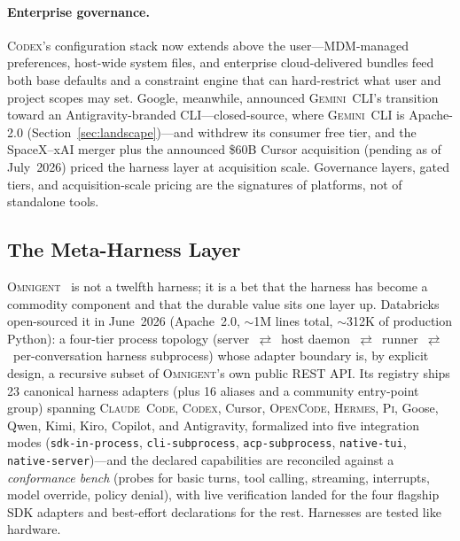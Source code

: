\documentclass[11pt,a4paper]{article}
\newcommand{\clcode}{\textsc{Claude~Code}\xspace}
\newcommand{\cdx}{\textsc{Codex}\xspace}
\newcommand{\gemini}{\textsc{Gemini~CLI}\xspace}
\newcommand{\hrm}{\textsc{Hermes}\xspace}
\newcommand{\pib}{\textsc{Pi}\xspace}
\newcommand{\ocd}{\textsc{OpenCode}\xspace}
\newcommand{\omni}{\textsc{Omnigent}\xspace}
\begin{document}
\paragraph{Enterprise governance.}
\cdx{}'s configuration stack now extends above the user---MDM-managed preferences, host-wide system files, and enterprise cloud-delivered bundles feed both base defaults and a constraint engine that can hard-restrict what user and project scopes may set.
Google, meanwhile, announced \gemini{}'s transition toward an Antigravity-branded CLI---closed-source, where \gemini{} is Apache-2.0 (Section~\ref{sec:landscape})---and withdrew its consumer free tier, and the SpaceX--xAI merger plus the announced \$60B Cursor acquisition (pending as of July~2026) priced the harness layer at acquisition scale.
Governance layers, gated tiers, and acquisition-scale pricing are the signatures of platforms, not of standalone tools.

\subsection{The Meta-Harness Layer}
\label{sec:omnigent}

\omni{}~\cite{omnigent2026} is not a twelfth harness; it is a bet that the harness has become a commodity component and that the durable value sits one layer up.
Databricks open-sourced it in June~2026 (Apache~2.0, $\sim$1M lines total, $\sim$312K of production Python): a four-tier process topology (server~$\rightleftarrows$~host daemon~$\rightleftarrows$~runner~$\rightleftarrows$~per-conversation harness subprocess) whose adapter boundary is, by explicit design, a recursive subset of \omni{}'s own public REST API.
Its registry ships 23 canonical harness adapters (plus 16 aliases and a community entry-point group) spanning \clcode{}, \cdx{}, Cursor, \ocd{}, \hrm{}, \pib{}, Goose, Qwen, Kimi, Kiro, Copilot, and Antigravity, formalized into five integration modes (\texttt{sdk-in-process}, \texttt{cli-subprocess}, \texttt{acp-subprocess}, \texttt{native-tui}, \texttt{native-server})---and the declared capabilities are reconciled against a \emph{conformance bench} (probes for basic turns, tool calling, streaming, interrupts, model override, policy denial), with live verification landed for the four flagship SDK adapters and best-effort declarations for the rest.
Harnesses are tested like hardware.
\end{document}
